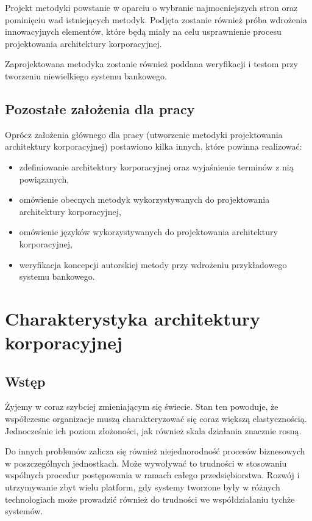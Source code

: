 Projekt metodyki powstanie w oparciu o wybranie najmocniejszych stron oraz pominięciu wad istniejących metodyk. Podjęta zostanie również próba wdrożenia innowacyjnych elementów, które będą miały na celu usprawnienie procesu projektowania architektury korporacyjnej.

Zaprojektowana metodyka zostanie również poddana weryfikacji i testom przy tworzeniu niewielkiego systemu bankowego.

\section{Pozostałe założenia dla pracy}
Oprócz założenia głównego dla pracy (utworzenie metodyki projektowania architektury korporacyjnej) postawiono kilka innych, które powinna realizować:
\begin{itemize}
\item{zdefiniowanie architektury korporacyjnej oraz wyjaśnienie terminów z nią powiązanych,}
\item{omówienie obecnych metodyk wykorzystywanych do projektowania architektury korporacyjnej,}
\item{omówienie języków wykorzystywanych do projektowania architektury korporacyjnej,}
\item{weryfikacja koncepcji autorskiej metody przy wdrożeniu przykładowego systemu bankowego.}
\end{itemize}

\chapter{Charakterystyka architektury korporacyjnej}

\section{Wstęp}
Żyjemy w coraz szybciej zmieniającym się świecie. Stan ten powoduje, że współczesne organizacje muszą charakteryzować się coraz większą elastycznością. Jednocześnie ich poziom złożoności, jak również skala działania znacznie rosną.\cite{SobArchKorpDobrPr}

Do innych problemów zalicza się również niejednorodność procesów biznesowych w poszczególnych jednostkach. Może wywoływać to trudności w stosowaniu wspólnych procedur postępowania w ramach całego przedsiębiorstwa. Rozwój i utrzymywanie zbyt wielu platform, gdy systemy tworzone były w różnych technologiach może prowadzić również do trudności we współdziałaniu tychże systemów.

